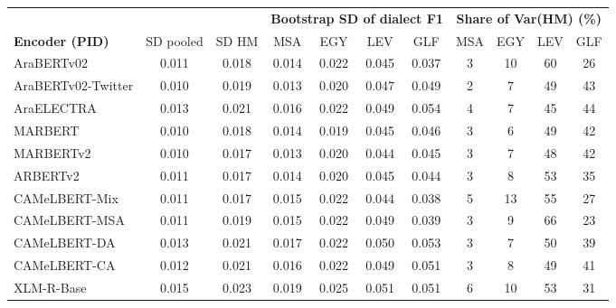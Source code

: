 \begin{tabular}{lcc|cccc|cccc}
\toprule
 & & & \multicolumn{4}{c|}{\textbf{Bootstrap SD of dialect F1}} & \multicolumn{4}{c}{\textbf{Share of Var(HM) (\%)}} \\
\textbf{Encoder (PID)} & SD pooled & SD HM & MSA & EGY & LEV & GLF & MSA & EGY & LEV & GLF \\
\midrule
AraBERTv02 & 0.011 & 0.018 & 0.014 & 0.022 & 0.045 & 0.037 & 3 & 10 & 60 & 26 \\
AraBERTv02-Twitter & 0.010 & 0.019 & 0.013 & 0.020 & 0.047 & 0.049 & 2 & 7 & 49 & 43 \\
AraELECTRA & 0.013 & 0.021 & 0.016 & 0.022 & 0.049 & 0.054 & 4 & 7 & 45 & 44 \\
MARBERT & 0.010 & 0.018 & 0.014 & 0.019 & 0.045 & 0.046 & 3 & 6 & 49 & 42 \\
MARBERTv2 & 0.010 & 0.017 & 0.013 & 0.020 & 0.044 & 0.045 & 3 & 7 & 48 & 42 \\
ARBERTv2 & 0.011 & 0.017 & 0.014 & 0.020 & 0.045 & 0.044 & 3 & 8 & 53 & 35 \\
CAMeLBERT-Mix & 0.011 & 0.017 & 0.015 & 0.022 & 0.044 & 0.038 & 5 & 13 & 55 & 27 \\
CAMeLBERT-MSA & 0.011 & 0.019 & 0.015 & 0.022 & 0.049 & 0.039 & 3 & 9 & 66 & 23 \\
CAMeLBERT-DA & 0.013 & 0.021 & 0.017 & 0.022 & 0.050 & 0.053 & 3 & 7 & 50 & 39 \\
CAMeLBERT-CA & 0.012 & 0.021 & 0.016 & 0.022 & 0.049 & 0.051 & 3 & 8 & 49 & 41 \\
XLM-R-Base & 0.015 & 0.023 & 0.019 & 0.025 & 0.051 & 0.051 & 6 & 10 & 53 & 31 \\
\bottomrule
\end{tabular}
